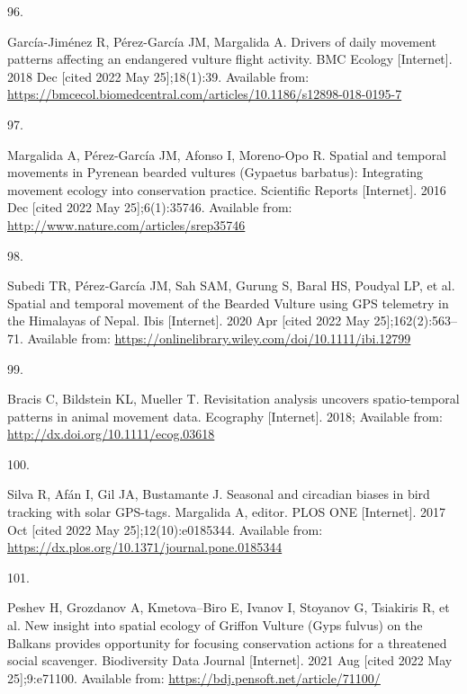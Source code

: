 \documentclass[10pt,a4paper]{article}
\newlength{\cslhangindent}
\newlength{\csllabelwidth}
\newlength{\cslentryspacingunit} %
\newenvironment{CSLReferences}[2] %
 {%
  \setlength{\parindent}{0pt}
  \ifodd #1
  \let\oldpar\par
  \def\par{\hangindent=\cslhangindent\oldpar}
  \fi
  \setlength{\parskip}{#2\cslentryspacingunit}
 }%
 {}
\newcommand{\CSLLeftMargin}[1]{\parbox[t]{\csllabelwidth}{#1}}
\newcommand{\CSLRightInline}[1]{\parbox[t]{\linewidth - \csllabelwidth}{#1}\break}
\begin{document}
\begin{CSLReferences}{0}{0}
\leavevmode{}%
\CSLLeftMargin{96. }
\CSLRightInline{García-Jiménez R, Pérez-García JM, Margalida A. Drivers of daily movement patterns affecting an endangered vulture flight activity. BMC Ecology {[}Internet{]}. 2018 Dec {[}cited 2022 May 25{]};18(1):39. Available from: \url{https://bmcecol.biomedcentral.com/articles/10.1186/s12898-018-0195-7}}

\leavevmode{}%
\CSLLeftMargin{97. }
\CSLRightInline{Margalida A, Pérez-García JM, Afonso I, Moreno-Opo R. Spatial and temporal movements in {Pyrenean} bearded vultures ({Gypaetus} barbatus): {Integrating} movement ecology into conservation practice. Scientific Reports {[}Internet{]}. 2016 Dec {[}cited 2022 May 25{]};6(1):35746. Available from: \url{http://www.nature.com/articles/srep35746}}

\leavevmode{}%
\CSLLeftMargin{98. }
\CSLRightInline{Subedi TR, Pérez‐García JM, Sah SAM, Gurung S, Baral HS, Poudyal LP, et al. Spatial and temporal movement of the {Bearded} {Vulture} using {GPS} telemetry in the {Himalayas} of {Nepal}. Ibis {[}Internet{]}. 2020 Apr {[}cited 2022 May 25{]};162(2):563--71. Available from: \url{https://onlinelibrary.wiley.com/doi/10.1111/ibi.12799}}

\leavevmode{}%
\CSLLeftMargin{99. }
\CSLRightInline{Bracis C, Bildstein KL, Mueller T. Revisitation analysis uncovers spatio-temporal patterns in animal movement data. Ecography {[}Internet{]}. 2018; Available from: \url{http://dx.doi.org/10.1111/ecog.03618}}

\leavevmode{}%
\CSLLeftMargin{100. }
\CSLRightInline{Silva R, Afán I, Gil JA, Bustamante J. Seasonal and circadian biases in bird tracking with solar {GPS}-tags. Margalida A, editor. PLOS ONE {[}Internet{]}. 2017 Oct {[}cited 2022 May 25{]};12(10):e0185344. Available from: \url{https://dx.plos.org/10.1371/journal.pone.0185344}}

\leavevmode{}%
\CSLLeftMargin{101. }
\CSLRightInline{Peshev H, Grozdanov A, Kmetova--Biro E, Ivanov I, Stoyanov G, Tsiakiris R, et al. New insight into spatial ecology of {Griffon} {Vulture} ({Gyps} fulvus) on the {Balkans} provides opportunity for focusing conservation actions for a threatened social scavenger. Biodiversity Data Journal {[}Internet{]}. 2021 Aug {[}cited 2022 May 25{]};9:e71100. Available from: \url{https://bdj.pensoft.net/article/71100/}}


\end{CSLReferences}
\end{document}
